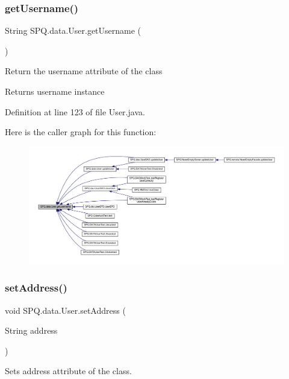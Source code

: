 \subsubsection{\texorpdfstring{get\+Username()}{getUsername()}}
{\footnotesize\ttfamily String S\+P\+Q.\+data.\+User.\+get\+Username (\begin{DoxyParamCaption}{ }\end{DoxyParamCaption})}

Return the username attribute of the class \begin{DoxyReturn}{Returns}
username instance 
\end{DoxyReturn}


Definition at line 123 of file User.\+java.

Here is the caller graph for this function\+:\nopagebreak
\begin{figure}[H]
\begin{center}
\leavevmode
\includegraphics[width=350pt]{class_s_p_q_1_1data_1_1_user_a55d2e322edbbe446287ce25baecdd421_icgraph}
\end{center}
\end{figure}
\mbox{\label{class_s_p_q_1_1data_1_1_user_ab6e40ae379cda1d98a5873365df30736}} 
\subsubsection{\texorpdfstring{set\+Address()}{setAddress()}}
{\footnotesize\ttfamily void S\+P\+Q.\+data.\+User.\+set\+Address (\begin{DoxyParamCaption}\item[{String}]{address }\end{DoxyParamCaption})}

Sets address attribute of the class. 

